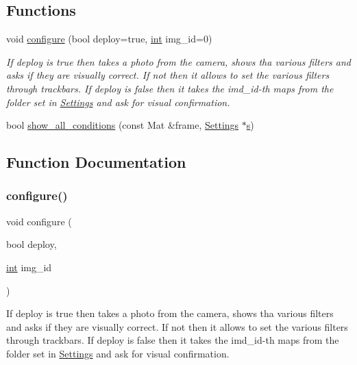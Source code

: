 \subsection*{Functions}
\begin{DoxyCompactItemize}
\item 
void \mbox{\hyperlink{configure_8hh_afff3976a7e359f9c2baef0fa59f0fca0}{configure}} (bool deploy=true, \mbox{\hyperlink{draw_8hh_aa620a13339ac3a1177c86edc549fda9b}{int}} img\+\_\+id=0)
\begin{DoxyCompactList}\small\item\em If deploy is true then takes a photo from the camera, shows tha various filters and asks if they are visually correct. If not then it allows to set the various filters through trackbars. If deploy is false then it takes the imd\+\_\+id-\/th maps from the folder set in \mbox{\hyperlink{class_settings}{Settings}} and ask for visual confirmation. \end{DoxyCompactList}\item 
bool \mbox{\hyperlink{configure_8hh_a8d7a029347b3667c49a14ee9fb6fb0ad}{show\+\_\+all\+\_\+conditions}} (const Mat \&frame, \mbox{\hyperlink{class_settings}{Settings}} $\ast$\mbox{\hyperlink{detection_8cc_a9090f9756293390c57567a0bf7630abf}{s}})
\end{DoxyCompactItemize}


\subsection{Function Documentation}
\mbox{\label{configure_8hh_afff3976a7e359f9c2baef0fa59f0fca0}} 
\subsubsection{\texorpdfstring{configure()}{configure()}}
{\footnotesize\ttfamily void configure (\begin{DoxyParamCaption}\item[{bool}]{deploy,  }\item[{\mbox{\hyperlink{draw_8hh_aa620a13339ac3a1177c86edc549fda9b}{int}}}]{img\+\_\+id }\end{DoxyParamCaption})}



If deploy is true then takes a photo from the camera, shows tha various filters and asks if they are visually correct. If not then it allows to set the various filters through trackbars. If deploy is false then it takes the imd\+\_\+id-\/th maps from the folder set in \mbox{\hyperlink{class_settings}{Settings}} and ask for visual confirmation. 

